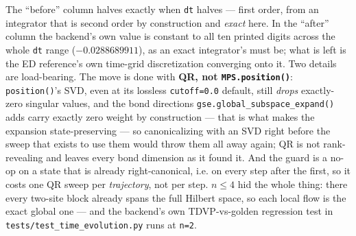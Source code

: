 \documentclass[11pt]{article}
\begin{document}
The ``before'' column halves exactly when \texttt{dt} halves --- first
order, from an integrator that is second order by construction and
\emph{exact} here. In the ``after'' column the backend's own value is
constant to all ten printed digits across the whole \texttt{dt} range
($-0.0288689911$), as an exact integrator's must be; what is left is the
ED reference's own time-grid discretization converging onto it.
Two details are load-bearing. The move is done with \textbf{QR, not
\texttt{MPS.position()}}: \texttt{position()}'s SVD, even at its lossless
\texttt{cutoff=0.0} default, still \emph{drops} exactly-zero singular
values, and the bond directions
\texttt{gse.global\_subspace\_expand()} adds carry exactly zero weight by
construction --- that is what makes the expansion state-preserving --- so
canonicalizing with an SVD right before the sweep that exists to use them
would throw them all away again; QR is not rank-revealing and leaves
every bond dimension as it found it. And the guard is a no-op on a state
that is already right-canonical, i.e. on every step after the first, so
it costs one QR sweep per \emph{trajectory}, not per step. $n\le4$ hid
the whole thing: there every two-site block already spans the full
Hilbert space, so each local flow is the exact global one --- and the
backend's own TDVP-vs-golden regression test in
\texttt{tests/test\_time\_evolution.py} runs at \texttt{n=2}.
\end{document}
